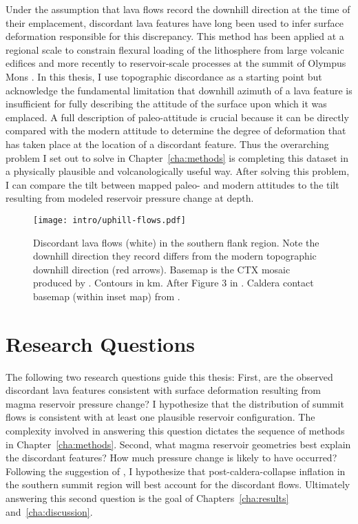 Under the assumption that lava flows record the downhill direction at the time of their emplacement, discordant lava features have long been used to infer surface deformation responsible for this discrepancy. This method has been applied at a regional scale to constrain flexural loading of the lithosphere from large volcanic edifices \parencite{mouginis-mark_ancient_1982,isherwood_volcanic_2013,chadwick_late_2015} and more recently to reservoir-scale processes at the summit of Olympus Mons \parencite{mouginis-mark_late-stage_2019}. In this thesis, I use topographic discordance as a starting point but acknowledge the fundamental limitation that downhill azimuth of a lava feature is insufficient for fully describing the attitude of the surface upon which it was emplaced. A full description of paleo-attitude is crucial because it can be directly compared with the modern attitude to determine the degree of deformation that has taken place at the location of a discordant feature. Thus the overarching problem I set out to solve in Chapter~\ref{cha:methods} is completing this dataset in a physically plausible and volcanologically useful way. After solving this problem, I can compare the tilt between mapped paleo- and modern attitudes to the tilt resulting from modeled reservoir pressure change at depth.

\begin{figure}
    \centering
    \texttt{[image: intro/uphill-flows.pdf]}
    \caption[Discordant lava flows]{Discordant lava flows (white) in the southern flank region. Note the downhill direction they record differs from the modern topographic downhill direction (red arrows). Basemap is the \acf{CTX} mosaic produced by \textcite{Dickson2018AGB}. Contours in \unit{\km}. After Figure 3 in \textcite{mouginis-mark_late-stage_2019}. Caldera contact basemap (within inset map) from \textcite{mouginis-mark_geologic_2021}.}%
    \label{fig:uphill-flows}
\end{figure}

\section{Research Questions}\label{sec:research-questions}
The following two research questions guide this thesis: First, are the observed discordant lava features consistent with surface deformation resulting from magma reservoir pressure change? I hypothesize that the distribution of summit flows is consistent with at least one plausible reservoir configuration. The complexity involved in answering this question dictates the sequence of methods in Chapter~\ref{cha:methods}. Second, what magma reservoir geometries best explain the discordant features? How much pressure change is likely to have occurred? Following the suggestion of \textcite{mouginis-mark_late-stage_2019}, I hypothesize that post-caldera-collapse inflation in the southern summit region will best account for the discordant flows. Ultimately answering this second question is the goal of Chapters~\ref{cha:results} and~\ref{cha:discussion}. 